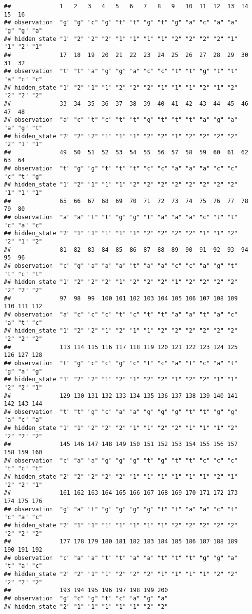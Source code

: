 \documentclass[
]{article}
\begin{document}
\begin{verbatim}
##              1   2   3   4   5   6   7   8   9   10  11  12  13  14  15  16 
## observation  "g" "g" "c" "g" "t" "t" "g" "t" "g" "a" "c" "a" "a" "g" "g" "a"
## hidden_state "1" "2" "2" "2" "1" "1" "1" "1" "2" "2" "2" "2" "1" "1" "2" "1"
##              17  18  19  20  21  22  23  24  25  26  27  28  29  30  31  32 
## observation  "t" "t" "a" "g" "g" "a" "c" "c" "t" "t" "g" "t" "t" "a" "c" "c"
## hidden_state "1" "2" "1" "1" "2" "2" "2" "1" "1" "1" "2" "1" "2" "2" "2" "2"
##              33  34  35  36  37  38  39  40  41  42  43  44  45  46  47  48 
## observation  "a" "c" "t" "c" "t" "t" "g" "t" "t" "t" "a" "g" "a" "a" "g" "t"
## hidden_state "2" "2" "2" "1" "1" "1" "2" "2" "1" "2" "2" "2" "2" "2" "1" "1"
##              49  50  51  52  53  54  55  56  57  58  59  60  61  62  63  64 
## observation  "t" "g" "g" "t" "t" "t" "c" "c" "a" "a" "a" "c" "c" "c" "t" "g"
## hidden_state "1" "2" "1" "1" "1" "2" "2" "2" "2" "2" "2" "2" "2" "1" "1" "1"
##              65  66  67  68  69  70  71  72  73  74  75  76  77  78  79  80 
## observation  "a" "a" "t" "t" "g" "g" "t" "a" "a" "a" "c" "t" "t" "c" "a" "c"
## hidden_state "2" "1" "1" "1" "1" "1" "2" "2" "2" "2" "1" "1" "2" "2" "1" "2"
##              81  82  83  84  85  86  87  88  89  90  91  92  93  94  95  96 
## observation  "c" "g" "a" "a" "a" "t" "a" "a" "c" "c" "a" "g" "t" "t" "c" "t"
## hidden_state "1" "2" "2" "2" "1" "2" "2" "2" "1" "2" "2" "2" "2" "2" "2" "2"
##              97  98  99  100 101 102 103 104 105 106 107 108 109 110 111 112
## observation  "a" "c" "c" "c" "t" "c" "t" "t" "a" "a" "t" "a" "c" "a" "t" "c"
## hidden_state "1" "2" "2" "1" "2" "1" "1" "2" "2" "2" "2" "2" "2" "2" "2" "2"
##              113 114 115 116 117 118 119 120 121 122 123 124 125 126 127 128
## observation  "t" "g" "c" "c" "g" "c" "t" "c" "a" "t" "c" "a" "t" "g" "a" "g"
## hidden_state "1" "2" "2" "1" "2" "1" "2" "2" "1" "2" "2" "1" "1" "2" "2" "1"
##              129 130 131 132 133 134 135 136 137 138 139 140 141 142 143 144
## observation  "t" "t" "g" "c" "a" "a" "g" "g" "g" "t" "t" "g" "g" "a" "c" "a"
## hidden_state "1" "1" "2" "2" "2" "1" "1" "2" "2" "1" "1" "1" "2" "2" "2" "2"
##              145 146 147 148 149 150 151 152 153 154 155 156 157 158 159 160
## observation  "c" "a" "a" "g" "g" "g" "t" "g" "t" "t" "c" "c" "c" "t" "c" "t"
## hidden_state "2" "2" "2" "2" "2" "1" "1" "1" "1" "1" "1" "2" "1" "2" "2" "1"
##              161 162 163 164 165 166 167 168 169 170 171 172 173 174 175 176
## observation  "g" "a" "t" "g" "g" "g" "g" "t" "t" "a" "a" "c" "t" "c" "a" "c"
## hidden_state "2" "1" "1" "1" "1" "1" "1" "1" "2" "2" "2" "2" "2" "2" "2" "2"
##              177 178 179 180 181 182 183 184 185 186 187 188 189 190 191 192
## observation  "c" "a" "a" "t" "t" "a" "a" "t" "t" "t" "g" "g" "a" "t" "a" "c"
## hidden_state "2" "2" "1" "1" "2" "2" "2" "1" "1" "1" "1" "2" "2" "2" "2" "2"
##              193 194 195 196 197 198 199 200
## observation  "g" "c" "g" "t" "c" "a" "g" "a"
## hidden_state "2" "1" "1" "1" "1" "1" "2" "2"
\end{verbatim}
\end{document}
